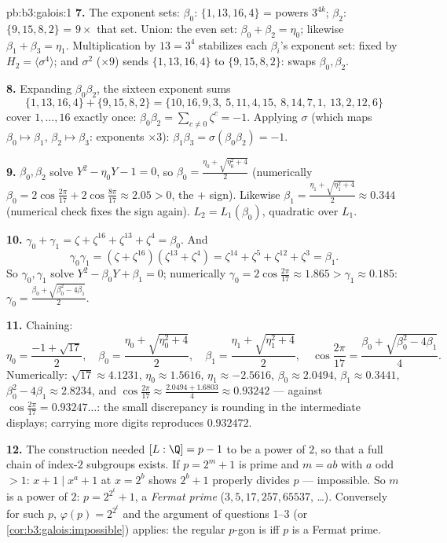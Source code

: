 \begin{solution}{pb:b3:galois:1}
\textbf{7.} The exponent sets: $\beta_0$: $\{1, 13, 16, 4\}$ =
powers $3^{4k}$; $\beta_2$: $\{9, 15, 8, 2\}$ = $9 \times$ that
set. Union: the even set: $\beta_0 + \beta_2 = \eta_0$; likewise
$\beta_1 + \beta_3 = \eta_1$. Multiplication by $13 = 3^4$
stabilizes each $\beta_i$'s exponent set: fixed by $H_2 =
\langle\sigma^4\rangle$; and $\sigma^2$ ($\times 9$) sends
$\{1,13,16,4\}$ to $\{9, 15, 8, 2\}$: swaps $\beta_0,
\beta_2$.

\textbf{8.} Expanding $\beta_0\beta_2$, the sixteen exponent
sums
\[
\{1,13,16,4\} + \{9,15,8,2\} =
\{10,16,9,3,\ 5,11,4,15,\ 8,14,7,1,\ 13,2,12,6\}
\]
cover $1, \dots, 16$ exactly once: $\beta_0\beta_2 =
\sum_{c\ne0}\zeta^c = -1$. Applying $\sigma$ (which maps
$\beta_0 \mapsto \beta_1$, $\beta_2 \mapsto \beta_3$:
exponents $\times 3$): $\beta_1\beta_3 = \sigma(\beta_0\beta_2)
= -1$.

\textbf{9.} $\beta_0, \beta_2$ solve $Y^2 - \eta_0 Y - 1 = 0$,
so $\beta_0 = \frac{\eta_0 + \sqrt{\eta_0^2 + 4}}2$ (numerically
$\beta_0 = 2\cos\frac{2\pi}{17} + 2\cos\frac{8\pi}{17} \approx
2.05 > 0$, the $+$ sign). Likewise $\beta_1 = \frac{\eta_1 +
\sqrt{\eta_1^2 + 4}}2 \approx 0.344$ (numerical check fixes the
sign again). $L_2 = L_1(\beta_0)$, quadratic over $L_1$.

\textbf{10.} $\gamma_0 + \gamma_1 = \zeta + \zeta^{16} +
\zeta^{13} + \zeta^4 = \beta_0$. And
\[
\gamma_0\gamma_1 = (\zeta + \zeta^{16})(\zeta^{13} + \zeta^4)
= \zeta^{14} + \zeta^{5} + \zeta^{12} + \zeta^{3} = \beta_1 .
\]
So $\gamma_0, \gamma_1$ solve $Y^2 - \beta_0Y + \beta_1 = 0$;
numerically $\gamma_0 = 2\cos\frac{2\pi}{17} \approx 1.865 >
\gamma_1 \approx 0.185$: $\gamma_0 = \frac{\beta_0 +
\sqrt{\beta_0^2 - 4\beta_1}}2$.

\textbf{11.} Chaining:
\[
\eta_0 = \frac{-1 + \sqrt{17}}2,
\quad
\beta_0 = \frac{\eta_0 + \sqrt{\eta_0^2 + 4}}2,
\quad
\beta_1 = \frac{\eta_1 + \sqrt{\eta_1^2 + 4}}2,
\quad
\cos\frac{2\pi}{17} = \frac{\beta_0 + \sqrt{\beta_0^2 -
4\beta_1}}4 .
\]
Numerically: $\sqrt{17} \approx 4.1231$, $\eta_0 \approx
1.5616$, $\eta_1 \approx -2.5616$, $\beta_0 \approx 2.0494$,
$\beta_1 \approx 0.3441$, $\beta_0^2 - 4\beta_1 \approx
2.8234$, and $\cos\frac{2\pi}{17} \approx \frac{2.0494 +
1.6803}4 \approx 0.93242$ --- against $\cos\frac{2\pi}{17} =
0.93247\dots$: the small discrepancy is rounding in the
intermediate displays; carrying more digits reproduces
$0.932472$.

\textbf{12.} The construction needed $[L:\Q] = p - 1$ to be a
power of $2$, so that a full chain of index-$2$ subgroups
exists. If $p = 2^m + 1$ is prime and $m = ab$ with $a$ odd $>
1$: $x + 1 \mid x^a + 1$ at $x = 2^b$ shows $2^b + 1$ properly
divides $p$ --- impossible. So $m$ is a power of $2$: $p =
2^{2^t} + 1$, a \emph{Fermat prime} ($3, 5, 17, 257, 65537$,
\dots). Conversely for such $p$, $\varphi(p) = 2^{2^t}$ and the
argument of questions 1--3 (or
\cref{cor:b3:galois:impossible}) applies: the regular $p$-gon
is  iff $p$ is a Fermat prime.


\end{solution}
